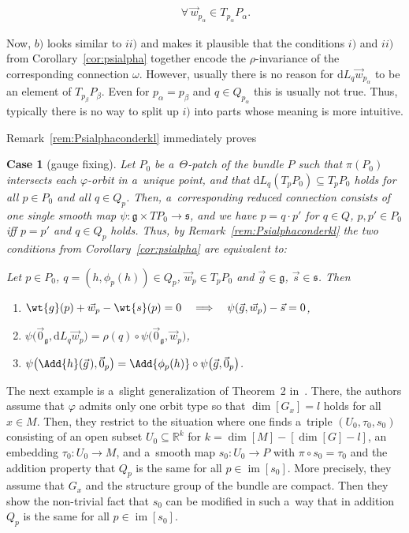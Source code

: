 \documentclass[pdftex]{sigma}
\numberwithin{equation}{section}
\newtheorem{scase}[Theorem]{Case}
{\theoremstyle{definition}
\newtheorem{Definition}[Theorem]{Definition}
\newtheorem{Convention}[Theorem]{Convention}
\newtheorem{Example}[Theorem]{Example}
\newtheorem{Remark}[Theorem]{Remark}
}
\begin{document}
\begin{Remark}
\begin{enumerate}
\begin{enumerate}
\begin{gather*}
\qquad\forall\, \vec{w}_{p_\alpha}\in T_{p_\alpha}P_\alpha.
\end{gather*}
\end{enumerate}
Now, $b)$ looks similar to $ii)$ and makes it plausible that the conditions
$i)$ and $ii)$ from Corollary~\ref{cor:psialpha} together encode the $\rho$-invariance of the corresponding
connection $\omega$.
However, usually there is no reason for $\mathrm{d} L_q \vec{w}_{p_\alpha}$ to be an element of $T_{p_\beta}P_\beta$.
Even for $p_\alpha=p_\beta$ and $q\in Q_{p_\alpha}$ this is usually not true.
Thus, typically there is no way to split up $i)$ into parts whose meaning is more intuitive.
\end{enumerate}
\end{Remark}

Remark~\ref{rem:Psialphaconderkl} immediately proves
\begin{scase}[gauge f\/ixing]
\label{scase:OneSlice}
Let $P_0$ be a~$\Theta$-patch of the bundle $P$ such that $\pi(P_0)$ intersects each $\varphi$-orbit in a~unique point,
and that $\mathrm{d} L_q(T_pP_0)\subseteq T_pP_0$ holds for all $p\in P_0$ and all $q \in Q_p$.
Then, a~corresponding reduced connection consists of one single smooth map $\psi\colon \mathfrak{g}\times TP_0\rightarrow
\mathfrak{s}$, and we have $p=q\cdot p'$ for $q\in Q$, $p,p'\in P_0$ iff $p=p'$ and $q\in Q_p$ holds.
Thus, by Remark~{\rm \ref{rem:Psialphaconderkl}} the two conditions from Corollary~{\rm \ref{cor:psialpha}} are equivalent to:

Let $p\in P_0$, $q=(h,\phi_p(h))\in Q_p$, $\vec{w}_p\in T_pP_0$ and $\vec{g}\in
\mathfrak{g}$, $\vec{s}\in \mathfrak{s}$.
Then
\begin{enumerate}\itemsep=0pt
\item[$i')$] $\wt{g}(p) +\vec{w}_{p}-\wt{s}(p)=0
\quad
\Longrightarrow
\quad
\psi(\vec{g},\vec{w}_{p})-\vec{s}=0$,
\item[$ii')$] $\psi\big(\vec{0}_{\mathfrak{g}},\mathrm{d}
L_q\vec{w}_{p}\big)=\rho(q)\circ\psi\big(\vec{0}_{\mathfrak{g}},\vec{w}_{p}\big)$,
\item[$iii')$]
$\psi\big(\Add{h}(\vec{g}\hspace{1pt}),\vec{0}_{p}\big)=\Add{\phi_p(h)}\circ\psi\big(\vec{g},\vec{0}_{p}\big)$.
\end{enumerate}
\end{scase}

 The next example is a~slight generalization of Theorem~2 in~\cite{HarSni}.
There, the authors assume that $\varphi$ admits only one orbit type so that $\dim[G_x]=l$ holds for all $x\in M$.
Then, they restrict to the situation where one f\/inds a~triple $(U_0,\tau_0,s_0)$ consisting of an open subset $U_0\subseteq
\mathbb{R}^k$ for $k=\dim[M]- [\dim[G]- l]$, an embedding $\tau_0\colon U_0 \rightarrow M$,  and
a~smooth map $s_0\colon U_0\rightarrow P$ with $\pi\circ s_0=\tau_0$ and the addition property that $Q_p$ is the same
for all $p\in \operatorname{\mathrm{im}}[s_0]$.
More precisely, they assume that $G_x$ and the structure group of the bundle are compact.
Then they show the non-trivial fact that $s_0$ can be modif\/ied in such a~way that in addition $Q_p$ is the same for all
$p\in \operatorname{\mathrm{im}}[s_0]$.
\end{document}
